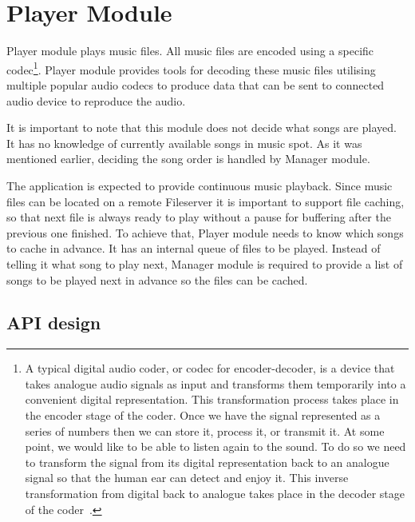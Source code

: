 \section{Player Module}

Player module plays music files. All music files are encoded using a specific codec\footnote{A typical digital audio coder, or codec for encoder-decoder, is a device that takes analogue audio signals as input and transforms them temporarily into a convenient digital representation. This transformation process takes place in the encoder stage of the coder. Once we have the signal represented as a series of numbers then we can store it, process it, or transmit it. At some point, we would like to be able to listen again to the sound. To do so we need to transform the signal from its digital representation back to an analogue signal so that the human ear can detect and enjoy it. This inverse transformation from digital back to analogue takes place in the decoder stage of the coder~\citep{IntroToDigitalAudio}.}. Player module provides tools for decoding these music files utilising multiple popular audio codecs to produce data that can be sent to connected audio device to reproduce the audio.
\par
It is important to note that this module does not decide what songs are played. It has no knowledge of currently available songs in music spot. As it was mentioned earlier, deciding the song order is handled by Manager module.
\par
The application is expected to provide continuous music playback. Since music files can be located on a remote Fileserver it is important to support file caching, so that next file is always ready to play without a pause for buffering after the previous one finished. To achieve that, Player module needs to know which songs to cache in advance. It has an internal queue of files to be played. Instead of telling it what song to play next, Manager module is required to provide a list of songs to be played next in advance so the files can be cached.

\subsection{API design}

